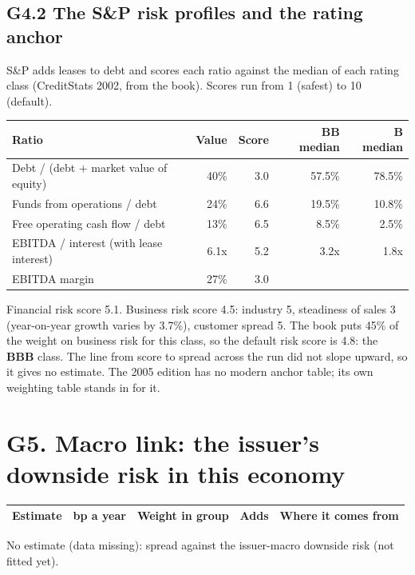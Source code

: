 \documentclass[11pt,a4paper]{article}
\begin{document}
\subsection*{G4.2 The S\&P risk profiles and the rating anchor}
S\&P adds leases to debt and scores each ratio against the median of each rating class (CreditStats 2002, from the book). Scores run from 1 (safest) to 10 (default).
\begin{center}\footnotesize\setlength{\tabcolsep}{3.5pt}\begin{tabular}{@{}lrrrr@{}}\toprule
Ratio & Value & Score & BB median & B median \\\midrule
Debt / (debt + market value of equity) & 40\% & 3.0 & 57.5\% & 78.5\% \\
Funds from operations / debt & 24\% & 6.6 & 19.5\% & 10.8\% \\
Free operating cash flow / debt & 13\% & 6.5 & 8.5\% & 2.5\% \\
EBITDA / interest (with lease interest) & 6.1x & 5.2 & 3.2x & 1.8x \\
EBITDA margin & 27\% & 3.0 &  &  \\
\bottomrule\end{tabular}\end{center}
Financial risk score 5.1. Business risk score 4.5: industry 5, steadiness of sales 3 (year-on-year growth varies by 3.7\%), customer spread 5. The book puts 45\% of the weight on business risk for this class, so the default risk score is 4.8: the \textbf{BBB} class. The line from score to spread across the run did not slope upward, so it gives no estimate. The 2005 edition has no modern anchor table; its own weighting table stands in for it.
\section*{G5. Macro link: the issuer's downside risk in this economy}
\par\noindent{}
\begin{center}\footnotesize\setlength{\tabcolsep}{3.5pt}\begin{tabular}{@{}p{6.2cm}rrrp{4.2cm}@{}}\toprule
Estimate & bp a year & Weight in group & Adds & Where it comes from \\\midrule
\bottomrule\end{tabular}\end{center}
No estimate (data missing): spread against the issuer-macro downside risk (not fitted yet).
\end{document}
